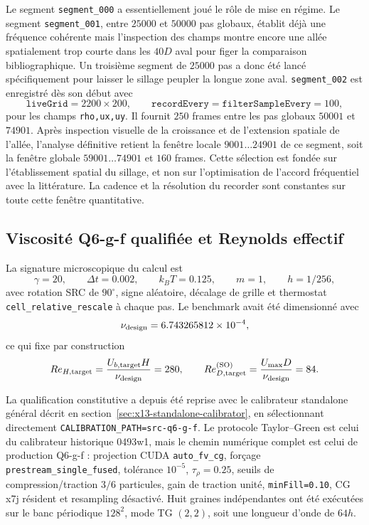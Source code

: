 \documentclass[11pt,a4paper]{article}
\begin{document}
Le segment \texttt{segment\_000} a essentiellement joué le rôle de mise en régime. Le segment \texttt{segment\_001}, entre $25000$ et $50000$ pas globaux, établit déjà une fréquence cohérente mais l'inspection des champs montre encore une allée spatialement trop courte dans les $40D$ aval pour figer la comparaison bibliographique. Un troisième segment de $25000$ pas a donc été lancé spécifiquement pour laisser le sillage peupler la longue zone aval. \texttt{segment\_002} est enregistré dès son début avec
\begin{equation}
  \texttt{liveGrid}=2200\times200,\qquad
  \texttt{recordEvery}=\texttt{filterSampleEvery}=100,
\end{equation}
pour les champs \texttt{rho,ux,uy}. Il fournit $250$ frames entre les pas globaux $50001$ et $74901$. Après inspection visuelle de la croissance et de l'extension spatiale de l'allée, l'analyse définitive retient la fenêtre locale $9001\ldots24901$ de ce segment, soit la fenêtre globale $59001\ldots74901$ et $160$ frames. Cette sélection est fondée sur l'établissement spatial du sillage, et non sur l'optimisation de l'accord fréquentiel avec la littérature. La cadence et la résolution du recorder sont constantes sur toute cette fenêtre quantitative.

\subsection{Viscosité Q6-g-f qualifiée et Reynolds effectif}
\label{sec:x8-viscosity-caveat}

La signature microscopique du calcul est
\begin{equation}
 \gamma=20,\qquad \Delta t=0.002,\qquad k_BT=0.125,\qquad
 m=1,\qquad h=1/256,
\end{equation}
avec rotation SRC de $90^\circ$, signe aléatoire, décalage de grille et thermostat \texttt{cell\_relative\_rescale} à chaque pas. Le benchmark avait été dimensionné avec
\begin{equation}
  \nu_{\rm design}=6.743265812\times10^{-4},
  \label{eq:x8-nu-design}
\end{equation}
ce qui fixe par construction
\begin{equation}
 Re_{H,\rm target}=\frac{U_{b,\rm target}H}{\nu_{\rm design}}=280,
 \qquad
 Re_{D,\rm target}^{(\rm SO)}=\frac{U_{\max}D}{\nu_{\rm design}}=84.
\end{equation}

La qualification constitutive a depuis été reprise avec le calibrateur standalone général décrit en section~\ref{sec:x13-standalone-calibrator}, en sélectionnant directement \texttt{CALIBRATION\_PATH=src-q6-g-f}. Le protocole Taylor--Green est celui du calibrateur historique 0493w1, mais le chemin numérique complet est celui de production Q6-g-f : projection CUDA \texttt{auto\_fv\_cg}, forçage \texttt{prestream\_single\_fused}, tolérance $10^{-5}$, $\tau_\rho=0.25$, seuils de compression/traction $3/6$ particules, gain de traction unité, \texttt{minFill=0.10}, CG x7j résident et resampling désactivé. Huit graines indépendantes ont été exécutées sur le banc périodique $128^2$, mode TG $(2,2)$, soit une longueur d'onde de $64h$.
\end{document}
